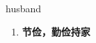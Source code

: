 
\begin{frame}
{\huge husband}
\begin{center}
\begin{enumerate}\Large
  \item \textbf{节俭，勤俭持家}
\end{enumerate}
\end{center}
\end{frame}
